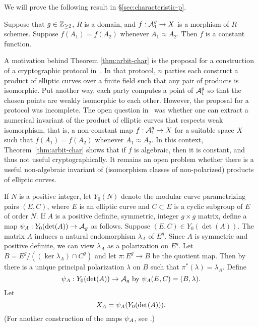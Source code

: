 \documentclass{amsart}
\begin{document}
We will prove the following result in \S\ref{sec:characteristic-p}.
\begin{theorem}\label{thm:arbit-char}
  Suppose that $g\in\mathbb{Z}_{\ge 2}$, $R$ is a domain, and $f: \mathcal{A}_1^g \to X$ is a morphism of $R$-schemes. Suppose $f(A_1) = f(A_2)$ whenever $A_1 \approx A_2$. Then $f$ is a constant function.
\end{theorem}

A motivation behind Theorem \ref{thm:arbit-char} is the proposal for a construction of a cryptographic protocol in~\cite{multiparty}. In that protocol, $n$ parties each construct a product of elliptic curves over a finite field such that any pair of products is isomorphic. Put another way, each party computes a point of $\mathcal{A}_1^g$ so that the chosen points are weakly isomorphic to each other. However, the proposal for a protocol was incomplete. The open question in~\cite{multiparty} was whether one can extract a numerical invariant of the product of elliptic curves that respects weak isomorphism, that is, a non-constant map $f: \mathcal{A}_1^g \to X$ for a suitable space $X$ such that $f(A_1) = f(A_2)$ whenever $A_1 \approx A_2$. In this context, Theorem~\ref{thm:arbit-char} shows that if $f$ is algebraic, then it is constant, and thus not useful cryptographically. It remains an open problem whether there is a useful non-algebraic invariant of (isomorphism classes of non-polarized) products of elliptic curves.


If $N$ is a positive integer, let $Y_0(N)$ denote the modular curve parametrizing pairs $(E, C)$, where $E$ is an elliptic curve and $C \subset E$ is a cyclic subgroup of $E$ of order $N$. If $A$ is a positive definite, symmetric, integer $g\times g$ matrix, define a map $\psi_{A}: Y_0(\det(A)) \to \mathcal{A}_g$ as follows. Suppose $(E, C) \in Y_0(\det(A))$. The matrix $A$ induces a natural endomorphism $\lambda_A$ of $E^g$. Since $A$ is symmetric and positive definite, we can view $\lambda_A$ as a polarization on $E^g$. Let $B = E^g/((\ker \lambda_A) \cap C^g)$ and let $\pi: E^g \to B$ be the quotient map. Then by~\cite[Prop. 16.8]{milne-av} there is a unique principal polarization $\lambda$ on $B$ such that $\pi^*(\lambda) = \lambda_A$. Define
\begin{equation}\label{def:psimoddef}
\psi_{A}: Y_0(\det(A)) \to \mathcal{A}_g  \text{ by } \psi_{A}(E,C) = (B,\lambda).
\end{equation}
Let
\begin{equation}\label{def:XAdef}
X_A=\psi_{A}(Y_0(\det(A))).
\end{equation}
(For another construction of the maps $\psi_{A}$, see \cite[p. 19 et seq.]{rains}.)
\end{document}
